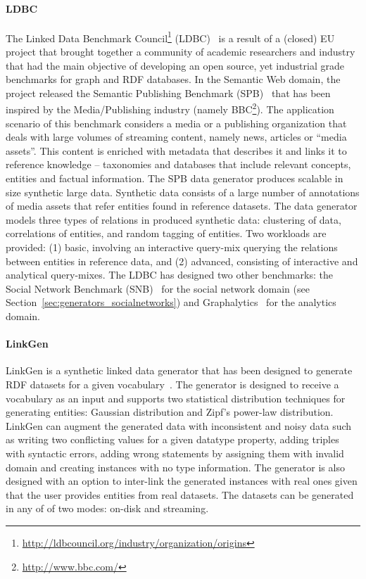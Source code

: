 \paragraph{LDBC}  The Linked Data Benchmark Council\footnote{\url{http://ldbcouncil.org/industry/organization/origins}} (LDBC)~\cite{Angles:2014:LDB:2627692.2627697} is a result of a (closed) EU project that brought together a community of academic researchers and industry that had the main objective of developing an open source, yet industrial grade benchmarks for graph and RDF databases. \iffalse The following three benchmarks were developed and are currently maintained.\fi In the Semantic Web domain, the project released the Semantic Publishing Benchmark (SPB)~\cite{spb} that has been inspired by the Media/Publishing industry (namely BBC\footnote{\url{http://www.bbc.com/}}). The application scenario of this benchmark considers a media or a publishing organization that deals with large volumes of streaming content, namely news, articles or  ``media assets''. This content is enriched with metadata that describes it and links it to reference knowledge -- taxonomies and databases that include relevant concepts, entities and factual information. The SPB data generator produces scalable in size synthetic large data. Synthetic data consists of a large number of annotations of media assets that refer entities found in reference datasets. The data generator models three types of relations in produced synthetic data: clustering of data, correlations of entities, and random tagging of entities. Two workloads are provided: (1) basic, involving an interactive query-mix querying the relations between entities in reference data, and (2) advanced,  consisting of interactive and analytical query-mixes. The LDBC has designed two other benchmarks: the Social Network Benchmark (SNB)~\cite{Erling:2015:LSN:2723372.2742786} for the social network domain  (see Section~\ref{sec:generators_socialnetworks}) and Graphalytics~\cite{Iosup:2016:LGB:3007263.3007270}   for the analytics domain.%



\paragraph{LinkGen} LinkGen is a synthetic linked data generator that has been designed to generate RDF datasets for a given vocabulary~\cite{10.1007/978-3-319-46547-0_12}. The generator is designed to receive a vocabulary as an input  and supports two statistical distribution techniques for generating entities: Gaussian distribution and Zipf's power-law distribution. LinkGen can augment the generated data with inconsistent and noisy  data such as writing two conflicting values for a given datatype property,  adding triples with syntactic errors, adding wrong statements by assigning them with invalid domain and creating instances with no type information. The generator is also designed with  an option to inter-link the generated instances with real ones given that the user provides entities from real datasets. The datasets can be generated in any of of two modes: on-disk and streaming.

